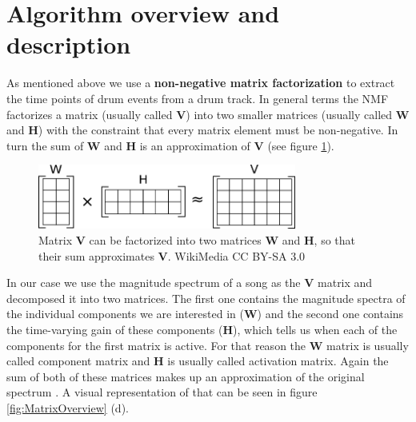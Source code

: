 \documentclass{article}
\begin{document}




\section{Algorithm overview and description}
\label{sec:algo}

As mentioned above we use a \textbf{non-negative matrix factorization} to extract the time points of drum events from a drum track.
In general terms the NMF factorizes a matrix (usually called $\mathbf{V}$) into two smaller matrices (usually called $\mathbf{W}$ and $\mathbf{H}$) with the constraint that every matrix element must be non-negative.
In turn the sum of $\mathbf{W}$ and $\mathbf{H}$ is an approximation of $\mathbf{V}$ (see figure \ref{fig:NMF}).

\begin{figure}[htb]

\begin{minipage}[b]{1.0\linewidth}
  \centering
  \centerline{\includegraphics[width=8.5cm]{figures/NMF}}
  \medskip
\end{minipage}

\caption{Matrix $\mathbf{V}$ can be factorized into two matrices $\mathbf{W}$ and $\mathbf{H}$, so that their sum approximates $\mathbf{V}$. \scriptsize{\textsf{\textcopyright} WikiMedia CC BY-SA 3.0}}
\label{fig:NMF}

\end{figure}

In our case we use the magnitude spectrum of a song as the $\mathbf{V}$ matrix and decomposed it into two matrices.
The first one contains the magnitude spectra of the individual components we are interested in ($\mathbf{W}$) and the second one contains the time-varying gain of these components ($\mathbf{H}$), which tells us when each of the components for the first matrix is active.
For that reason the $\mathbf{W}$ matrix is usually called component matrix and $\mathbf{H}$ is usually called activation matrix.
Again the sum of both of these matrices makes up an approximation of the original spectrum \cite{smaragdis2003}.
A visual representation of that can be seen in figure \ref{fig:MatrixOverview} (d).
\end{document}
